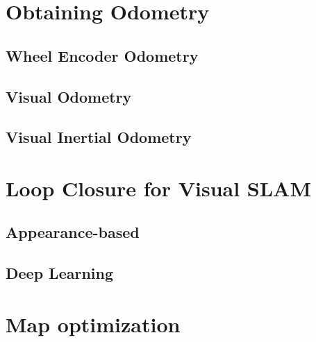 \section{Obtaining Odometry}

\subsection{Wheel Encoder Odometry}

\subsection{Visual Odometry}

\subsection{Visual Inertial Odometry}


\section{Loop Closure for Visual SLAM}

\subsection{Appearance-based}

\subsection{Deep Learning}


\section{Map optimization}



\filbreak